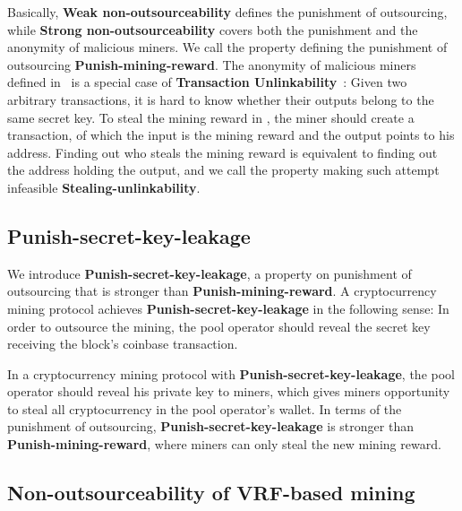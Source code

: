 Basically, \textbf{Weak non-outsourceability} defines the punishment of outsourcing, while \textbf{Strong non-outsourceability} covers both the punishment and the anonymity of malicious miners.
We call the property defining the punishment of outsourcing \textbf{Punish-mining-reward}.
The anonymity of malicious miners defined in~\cite{miller2015nonoutsourceable} is a special case of \textbf{Transaction Unlinkability}~\cite{van2013cryptonote}: Given two arbitrary transactions, it is hard to know whether their outputs belong to the same secret key.
To steal the mining reward in \cite{miller2015nonoutsourceable}, the miner should create a transaction, of which the input is the mining reward and the output points to his address.
Finding out who steals the mining reward is equivalent to finding out the address holding the output, and we call the property making such attempt infeasible \textbf{Stealing-unlinkability}.


\subsection{Punish-secret-key-leakage}

We introduce \textbf{Punish-secret-key-leakage}, a property on punishment of outsourcing that is stronger than \textbf{Punish-mining-reward}.
A cryptocurrency mining protocol achieves \textbf{Punish-secret-key-leakage} in the following sense: In order to outsource the mining, the pool operator should reveal the secret key receiving the block's coinbase transaction.

In a cryptocurrency mining protocol with \textbf{Punish-secret-key-leakage}, the pool operator should reveal his private key to miners, which gives miners opportunity to steal all cryptocurrency in the pool operator's wallet.
In terms of the punishment of outsourcing, \textbf{Punish-secret-key-leakage} is stronger than \textbf{Punish-mining-reward}, where miners can only steal the new mining reward.






\subsection{Non-outsourceability of VRF-based mining}


